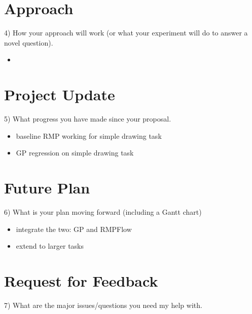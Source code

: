 \documentclass{article}
\begin{document}
\section{Approach}
4) How your approach will work (or what your experiment will do to answer a novel question).

\begin{itemize}
    \item 
\end{itemize}



\section{Project Update}

5) What progress you have made since your proposal.
\begin{itemize}
    \item baseline RMP working for simple drawing task
    \item GP regression on simple drawing task
\end{itemize}


\section{Future Plan}

6) What is your plan moving forward (including a Gantt chart)

\begin{itemize}
    \item integrate the two: GP and RMPFlow
    \item extend to larger tasks 
\end{itemize}


\section{Request for Feedback}

7) What are the major issues/questions you need my help with.
\end{document}
